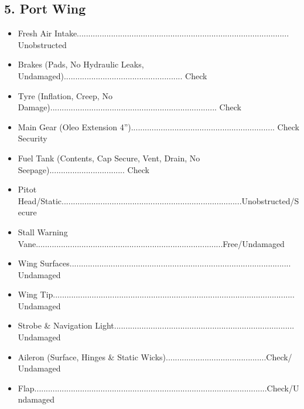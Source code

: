 \documentclass[a4paper]{article}
\newenvironment{checklist}{
  \begin{itemize}[leftmargin=*, align=left]
    \setlength{\itemsep}{2pt}
    \setlength{\parskip}{0pt}
    \setlength{\parsep}{0pt}
}{
  \end{itemize}
}
\begin{document}
\subsection*{5. Port Wing}
\begin{checklist}
\item Fresh Air Intake............................................................................................. Unobstructed
\item Brakes (Pads, No Hydraulic Leaks, Undamaged).................................................... Check
\item Tyre (Inflation, Creep, No Damage)......................................................................... Check
\item Main Gear (Oleo Extension 4\textonehalf”)............................................................... Check Security
\item Fuel Tank (Contents, Cap Secure, Vent, Drain, No Seepage)................................. Check
\item Pitot Head/Static...............................................................................Unobstructed/Secure
\item Stall Warning Vane..................................................................................Free/Undamaged
\item Wing Surfaces................................................................................................. Undamaged
\item Wing Tip.......................................................................................................... Undamaged
\item Strobe \& Navigation Light............................................................................... Undamaged
\item Aileron (Surface, Hinges \& Static Wicks)............................................Check/ Undamaged
\item Flap......................................................................................................Check/Undamaged
\end{checklist}
\end{document}
